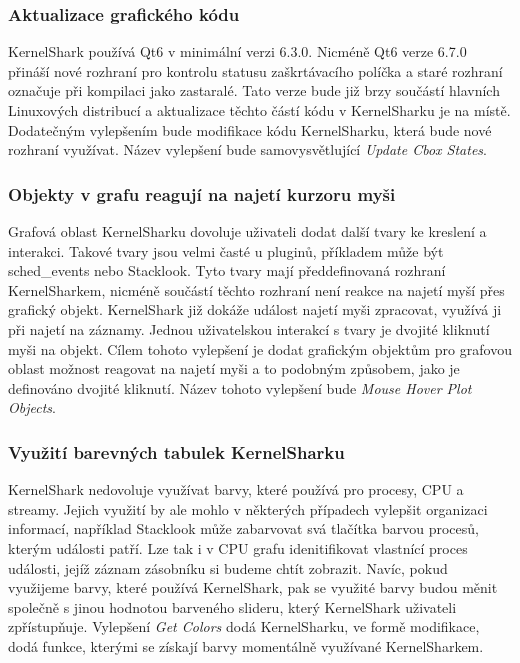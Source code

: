 \subsubsection*{Aktualizace grafického kódu}
KernelShark používá Qt6 v minimální verzi 6.3.0. Nicméně Qt6 verze 6.7.0 přináší nové rozhraní pro kontrolu statusu zaškrtávacího políčka a staré rozhraní označuje při kompilaci jako zastaralé. Tato verze bude již brzy součástí hlavních Linuxových distribucí a aktualizace těchto částí kódu v KernelSharku je na místě. Dodatečným vylepšením bude modifikace kódu KernelSharku, která bude nové rozhraní využívat. Název vylepšení bude samovysvětlující \emph{Update Cbox States}.

\subsubsection*{Objekty v grafu reagují na najetí kurzoru myši}
Grafová oblast KernelSharku dovoluje uživateli dodat další tvary ke kreslení a interakci. Takové tvary jsou velmi časté u pluginů, příkladem může být sched\_events nebo Stacklook. Tyto tvary mají předdefinovaná rozhraní KernelSharkem, nicméně součástí těchto rozhraní není reakce na najetí myší přes grafický objekt. KernelShark již dokáže událost najetí myši zpracovat, využívá ji při najetí na záznamy. Jednou uživatelskou interakcí s tvary je dvojité kliknutí myši na objekt. Cílem tohoto vylepšení je dodat grafickým objektům pro grafovou oblast možnost reagovat na najetí myši a to podobným způsobem, jako je definováno dvojité kliknutí. Název tohoto vylepšení bude \emph{Mouse Hover Plot Objects}.

\subsubsection*{Využití barevných tabulek KernelSharku}
KernelShark nedovoluje využívat barvy, které používá pro procesy, CPU a streamy. Jejich využití by ale mohlo v některých případech vylepšit organizaci informací, například Stacklook může zabarvovat svá tlačítka barvou procesů, kterým události patří. Lze tak i v CPU grafu idenitifikovat vlastnící proces události, jejíž záznam zásobníku si budeme chtít zobrazit. Navíc, pokud využijeme barvy, které používá KernelShark, pak se využité barvy budou měnit společně s jinou hodnotou barveného slideru, který KernelShark uživateli zpřístupňuje. Vylepšení \emph{Get Colors} dodá KernelSharku, ve formě modifikace, dodá funkce, kterými se získají barvy momentálně využívané KernelSharkem.

